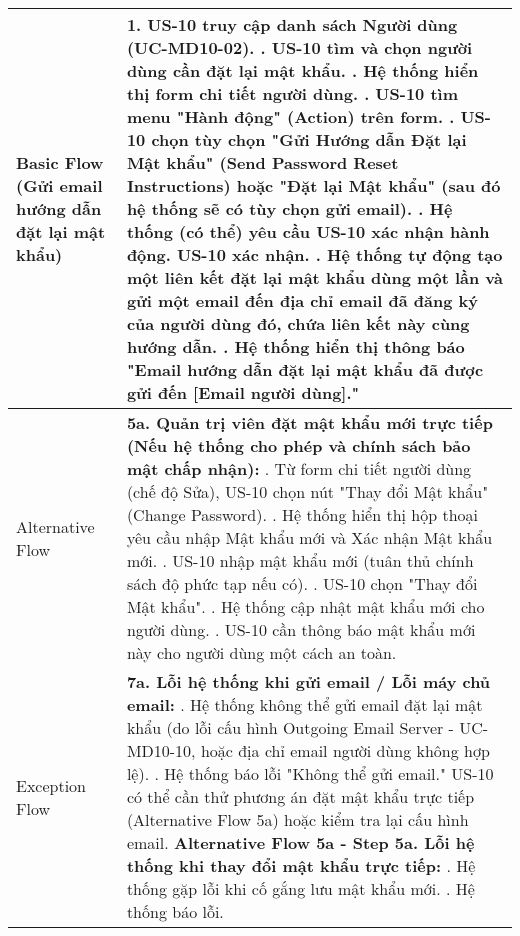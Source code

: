 \begin{longtable}{|m{4cm}|p{11cm}|}
Basic Flow (Gửi email hướng dẫn đặt lại mật khẩu) & 1. US-10 truy cập danh sách Người dùng (UC-MD10-02). \newline 2. US-10 tìm và chọn người dùng cần đặt lại mật khẩu. \newline 3. Hệ thống hiển thị form chi tiết người dùng. \newline 4. US-10 tìm menu "Hành động" (Action) trên form. \newline 5. US-10 chọn tùy chọn "Gửi Hướng dẫn Đặt lại Mật khẩu" (Send Password Reset Instructions) hoặc "Đặt lại Mật khẩu" (sau đó hệ thống sẽ có tùy chọn gửi email). \newline 6. Hệ thống (có thể) yêu cầu US-10 xác nhận hành động. US-10 xác nhận. \newline 7. Hệ thống tự động tạo một liên kết đặt lại mật khẩu dùng một lần và gửi một email đến địa chỉ email đã đăng ký của người dùng đó, chứa liên kết này cùng hướng dẫn. \newline 8. Hệ thống hiển thị thông báo "Email hướng dẫn đặt lại mật khẩu đã được gửi đến [Email người dùng]." \\
\hline
Alternative Flow & \textbf{5a. Quản trị viên đặt mật khẩu mới trực tiếp (Nếu hệ thống cho phép và chính sách bảo mật chấp nhận):} \newline    1. Từ form chi tiết người dùng (chế độ Sửa), US-10 chọn nút "Thay đổi Mật khẩu" (Change Password). \newline    2. Hệ thống hiển thị hộp thoại yêu cầu nhập Mật khẩu mới và Xác nhận Mật khẩu mới. \newline    3. US-10 nhập mật khẩu mới (tuân thủ chính sách độ phức tạp nếu có). \newline    4. US-10 chọn "Thay đổi Mật khẩu". \newline    5. Hệ thống cập nhật mật khẩu mới cho người dùng. \newline    6. US-10 cần thông báo mật khẩu mới này cho người dùng một cách an toàn. \\
\hline
Exception Flow & \textbf{7a. Lỗi hệ thống khi gửi email / Lỗi máy chủ email:} \newline    1. Hệ thống không thể gửi email đặt lại mật khẩu (do lỗi cấu hình Outgoing Email Server - UC-MD10-10, hoặc địa chỉ email người dùng không hợp lệ). \newline    2. Hệ thống báo lỗi "Không thể gửi email." US-10 có thể cần thử phương án đặt mật khẩu trực tiếp (Alternative Flow 5a) hoặc kiểm tra lại cấu hình email. \newline \textbf{Alternative Flow 5a - Step 5a. Lỗi hệ thống khi thay đổi mật khẩu trực tiếp:} \newline    1. Hệ thống gặp lỗi khi cố gắng lưu mật khẩu mới. \newline    2. Hệ thống báo lỗi. \\

\end{longtable}
